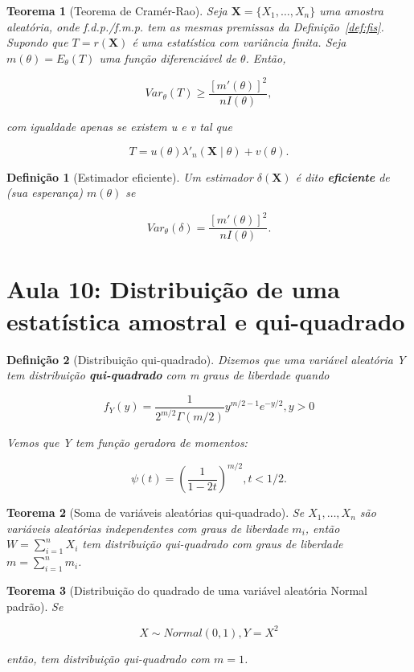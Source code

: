 \documentclass{article}
\newtheorem{theorem}{Teorema}
\newtheorem{definition}{Definição}
\begin{document}
\begin{theorem}[Teorema de Cramér-Rao]
Seja $\textbf{X} = \{ X_1, \ldots, X_n \}$ uma amostra aleatória, onde f.d.p./f.m.p. tem as mesmas premissas da Definição~\ref{def:fis}. Supondo que $T = r(\textbf{X})$ é uma estatística com variância finita. Seja $m(\theta) = E_\theta(T)$ uma função diferenciável de $\theta$. Então,

\begin{equation}
    Var_\theta(T) \geq \frac{[m'(\theta)]^2}{n I(\theta)},
\end{equation}

com igualdade apenas se existem u e v tal que

$$T = u(\theta) \lambda'_n (\textbf{X} \mid \theta) + v(\theta).$$
\end{theorem}

\begin{definition}[Estimador eficiente]
Um estimador $\delta(\textbf{X})$ é dito \textbf{eficiente} de (sua esperança) $m(\theta)$ se

$$Var_\theta(\delta) = \frac{[m'(\theta)]^2}{n I(\theta)}.$$
\end{definition}

\section*{Aula 10: Distribuição de uma estatística amostral e qui-quadrado}
\label{s10}
\begin{definition}[Distribuição qui-quadrado]
Dizemos que uma variável aleatória Y tem distribuição \textbf{qui-quadrado} com m graus de liberdade quando

\begin{equation}
    f_Y(y) = \frac{1}{2^{m/2} \Gamma(m/2)} y^{m/2 - 1} e^{-y/2}, y > 0
\end{equation}

Vemos que Y tem função geradora de momentos:

$$\psi (t) = \left ( \frac{1}{1 - 2t} \right )^{m/2}, t < 1/2.$$
\end{definition}

\begin{theorem}[Soma de variáveis aleatórias qui-quadrado]
Se $X_1, \ldots, X_n$ são variáveis aleatórias independentes com graus de liberdade $m_i$, então $W = \sum_{i = 1}^n X_i$ tem distribuição qui-quadrado com graus de liberdade $m = \sum_{i = 1}^n m_i$.
\end{theorem}

\begin{theorem}[Distribuição do quadrado de uma variável aleatória Normal padrão]
Se 

$$X \sim Normal(0, 1), Y = X^2$$ 

então, tem distribuição qui-quadrado com $m = 1$.
\end{theorem}
\end{document}
